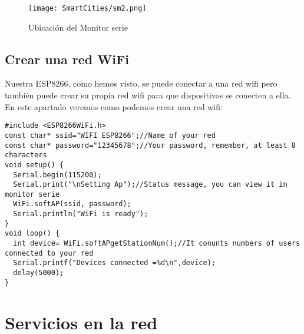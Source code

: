 \documentclass[
	12pt, %
	fleqn, %
	a4paper, %
	oneside, %
]{LegrandOrangeBook}
\begin{document}
\begin{figure}[ht]
\centering\texttt{[image: SmartCities/sm2.png]}
\caption{Ubicación del Monitor serie}
\label{fig:Monitor serie}
\end{figure}
\newpage
\section{Crear una red WiFi}
Nuestra ESP8266, como hemos visto, se puede conectar a una red wifi pero también puede crear su propia red wifi para que dispositivos se conecten a ella. En este apartado veremos como podemos crear una red wifi:
\begin{lstlisting}[language=Arduino,caption={Conectarse a una red WiFi}]
#include <ESP8266WiFi.h>
const char* ssid="WIFI ESP8266";//Name of your red
const char* password="12345678";//Your password, remember, at least 8 characters
void setup() {
  Serial.begin(115200);
  Serial.print("\nSetting Ap");//Status message, you can view it in monitor serie
  WiFi.softAP(ssid, password);
  Serial.println("WiFi is ready");
}
void loop() {
  int device= WiFi.softAPgetStationNum();//It conunts numbers of users connected to your red
  Serial.printf("Devices connected =%d\n",device);
  delay(5000);
}
\end{lstlisting}

\chapter{Servicios en la red}
\end{document}
